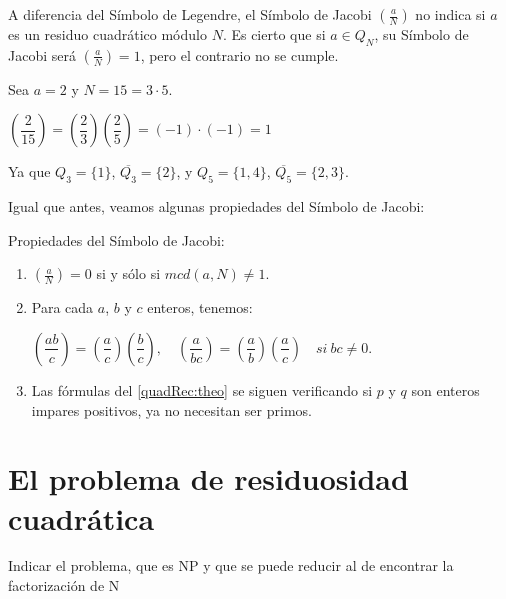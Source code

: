 \begin{remark}
	A diferencia del Símbolo de Legendre, el Símbolo de Jacobi $\left( \frac{a}{N} \right) $ no indica si $a$ es un residuo cuadrático módulo $N$. Es cierto que si $a \in Q_N$, su Símbolo de Jacobi será $\left( \frac{a}{N} \right) = 1$, pero el contrario no se cumple.
\end{remark}

\begin{example}
	Sea $a=2$ y $N=15=3\cdot 5$.
	\begin{center}
		$\left( \dfrac{2}{15} \right) = \left( \dfrac{2}{3} \right) \left( \dfrac{2}{5} \right) =  \left(-1\right) \cdot  \left(-1\right) = 1$
	\end{center}
	Ya que $Q_3 = \{1\}$, $\overline{Q_3}=\{2\}$, y $Q_5 = \{1,4\}$, $\overline{Q_5}=\{2,3\}$.
\end{example}

\hfil

Igual que antes, veamos algunas propiedades del Símbolo de Jacobi:


\begin{theorem}
	Propiedades del Símbolo de Jacobi:
	
	\begin{enumerate}[label=(\roman*)]
		\item 	$\left( \frac{a}{N} \right) = 0$ si y sólo si $mcd(a, N) \neq 1$.
		\item Para cada $a$, $b$ y $c$ enteros, tenemos: \\
		
		\begin{center}
			$
			\left( \dfrac{ab}{c} \right) = \left( \dfrac{a}{c} \right) \left( \dfrac{b}{c} \right), \quad \left( \dfrac{a}{bc} \right) = \left( \dfrac{a}{b} \right) \left( \dfrac{a}{c} \right) \quad si\ bc \neq 0
			$.
		\end{center}
		
		
		
		\item Las fórmulas del \autoref{quadRec:theo} se siguen verificando si $p$ y $q$ son enteros impares positivos, ya no necesitan ser primos.
		
	\end{enumerate}
\end{theorem}



\section{El problema de residuosidad cuadrática}


Indicar el problema, que es NP y que se puede reducir al de encontrar la factorización de N

